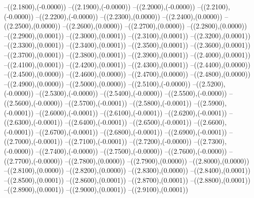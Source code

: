 {	--({\sx*(2.1800)},{\sy*(-0.0000)})
	--({\sx*(2.1900)},{\sy*(-0.0000)})
	--({\sx*(2.2000)},{\sy*(-0.0000)})
	--({\sx*(2.2100)},{\sy*(-0.0000)})
	--({\sx*(2.2200)},{\sy*(-0.0000)})
	--({\sx*(2.2300)},{\sy*(0.0000)})
	--({\sx*(2.2400)},{\sy*(0.0000)})
	--({\sx*(2.2500)},{\sy*(0.0000)})
	--({\sx*(2.2600)},{\sy*(0.0000)})
	--({\sx*(2.2700)},{\sy*(0.0000)})
	--({\sx*(2.2800)},{\sy*(0.0000)})
	--({\sx*(2.2900)},{\sy*(0.0001)})
	--({\sx*(2.3000)},{\sy*(0.0001)})
	--({\sx*(2.3100)},{\sy*(0.0001)})
	--({\sx*(2.3200)},{\sy*(0.0001)})
	--({\sx*(2.3300)},{\sy*(0.0001)})
	--({\sx*(2.3400)},{\sy*(0.0001)})
	--({\sx*(2.3500)},{\sy*(0.0001)})
	--({\sx*(2.3600)},{\sy*(0.0001)})
	--({\sx*(2.3700)},{\sy*(0.0001)})
	--({\sx*(2.3800)},{\sy*(0.0001)})
	--({\sx*(2.3900)},{\sy*(0.0001)})
	--({\sx*(2.4000)},{\sy*(0.0001)})
	--({\sx*(2.4100)},{\sy*(0.0001)})
	--({\sx*(2.4200)},{\sy*(0.0001)})
	--({\sx*(2.4300)},{\sy*(0.0001)})
	--({\sx*(2.4400)},{\sy*(0.0000)})
	--({\sx*(2.4500)},{\sy*(0.0000)})
	--({\sx*(2.4600)},{\sy*(0.0000)})
	--({\sx*(2.4700)},{\sy*(0.0000)})
	--({\sx*(2.4800)},{\sy*(0.0000)})
	--({\sx*(2.4900)},{\sy*(0.0000)})
	--({\sx*(2.5000)},{\sy*(0.0000)})
	--({\sx*(2.5100)},{\sy*(-0.0000)})
	--({\sx*(2.5200)},{\sy*(-0.0000)})
	--({\sx*(2.5300)},{\sy*(-0.0000)})
	--({\sx*(2.5400)},{\sy*(-0.0000)})
	--({\sx*(2.5500)},{\sy*(-0.0000)})
	--({\sx*(2.5600)},{\sy*(-0.0000)})
	--({\sx*(2.5700)},{\sy*(-0.0001)})
	--({\sx*(2.5800)},{\sy*(-0.0001)})
	--({\sx*(2.5900)},{\sy*(-0.0001)})
	--({\sx*(2.6000)},{\sy*(-0.0001)})
	--({\sx*(2.6100)},{\sy*(-0.0001)})
	--({\sx*(2.6200)},{\sy*(-0.0001)})
	--({\sx*(2.6300)},{\sy*(-0.0001)})
	--({\sx*(2.6400)},{\sy*(-0.0001)})
	--({\sx*(2.6500)},{\sy*(-0.0001)})
	--({\sx*(2.6600)},{\sy*(-0.0001)})
	--({\sx*(2.6700)},{\sy*(-0.0001)})
	--({\sx*(2.6800)},{\sy*(-0.0001)})
	--({\sx*(2.6900)},{\sy*(-0.0001)})
	--({\sx*(2.7000)},{\sy*(-0.0001)})
	--({\sx*(2.7100)},{\sy*(-0.0001)})
	--({\sx*(2.7200)},{\sy*(-0.0000)})
	--({\sx*(2.7300)},{\sy*(-0.0000)})
	--({\sx*(2.7400)},{\sy*(-0.0000)})
	--({\sx*(2.7500)},{\sy*(-0.0000)})
	--({\sx*(2.7600)},{\sy*(-0.0000)})
	--({\sx*(2.7700)},{\sy*(-0.0000)})
	--({\sx*(2.7800)},{\sy*(0.0000)})
	--({\sx*(2.7900)},{\sy*(0.0000)})
	--({\sx*(2.8000)},{\sy*(0.0000)})
	--({\sx*(2.8100)},{\sy*(0.0000)})
	--({\sx*(2.8200)},{\sy*(0.0000)})
	--({\sx*(2.8300)},{\sy*(0.0000)})
	--({\sx*(2.8400)},{\sy*(0.0001)})
	--({\sx*(2.8500)},{\sy*(0.0001)})
	--({\sx*(2.8600)},{\sy*(0.0001)})
	--({\sx*(2.8700)},{\sy*(0.0001)})
	--({\sx*(2.8800)},{\sy*(0.0001)})
	--({\sx*(2.8900)},{\sy*(0.0001)})
	--({\sx*(2.9000)},{\sy*(0.0001)})
	--({\sx*(2.9100)},{\sy*(0.0001)})
}

